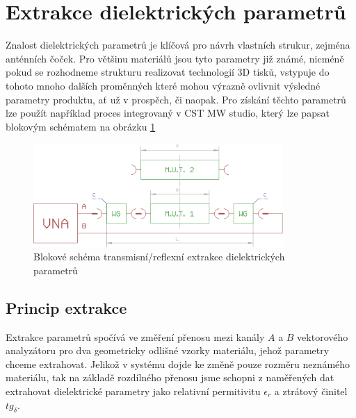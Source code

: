 \section{Extrakce dielektrických parametrů}
Znalost dielektrických parametrů je klíčová pro návrh vlastních strukur, zejména anténních čoček.
Pro většinu materiálů jsou tyto parametry již známé, nicméně pokud se rozhodneme strukturu realizovat technologií 3D tisků, vstypuje do tohoto mnoho dalších proměnných které mohou výrazně ovlivnit výsledné parametry produktu, ať už v prospěch, či naopak.
Pro získání těchto parametrů lze použít například proces integrovaný v CST MW studio, který lze papsat blokovým schématem na obrázku \ref{fig:ExtractBlock}
\begin{figure}[h]
\begin{center}
\includegraphics[width=9.5cm]{pics/ExtractBlock}
\caption{Blokové schéma transmisní/reflexní extrakce dielektrických parametrů}
\label{fig:ExtractBlock}
\end{center}
\end{figure} 
\subsection{Princip extrakce}
Extrakce parametrů spočívá ve změření přenosu mezi kanály $A$ a $B$ vektorového analyzátoru pro dva geometricky odlišné vzorky materiálu, jehož parametry chceme extrahovat. Jelikož v systému dojde ke změně pouze rozměru neznámého materiálu, tak na základě rozdílného přenosu jsme schopni z naměřených dat extrahovat dielektrické parametry jako relativní permitivitu $\epsilon_r$ a ztrátový činitel $tg_\delta$.
